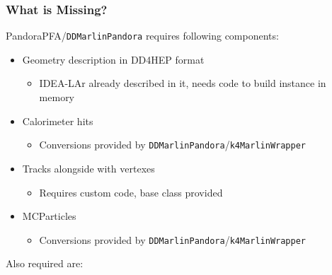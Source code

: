 \documentclass[aspectratio=169]{beamer}
\newcommand{\bluetext}[1]{%
  \textcolor{myBlue}{#1}
}
\newcommand{\redtext}[1]{%
  \textcolor{myRed}{#1}
}
\begin{document}
\begin{frame}
  \frametitle{What is Missing?}

  \scriptsize
  PandoraPFA/\texttt{DDMarlinPandora} requires following components:

  \vspace{-1ex}

  \begin{itemize}\scriptsize
    \item \bluetext{Geometry description in DD4HEP format}
          \begin{itemize}\scriptsize
            \item IDEA-LAr already described in it, needs code to build
                  instance in memory
          \end{itemize}
   \item \bluetext{Calorimeter hits}
          \begin{itemize}\scriptsize
            \item Conversions provided by
                  \texttt{DDMarlinPandora}/\texttt{k4MarlinWrapper}
          \end{itemize}
    \item \redtext{Tracks alongside with vertexes}
          \begin{itemize}\scriptsize
            \item Requires custom code, base class provided
          \end{itemize}
    \item \bluetext{MCParticles}
          \begin{itemize}\scriptsize
            \item Conversions provided by
                  \texttt{DDMarlinPandora}/\texttt{k4MarlinWrapper}
          \end{itemize}
  \end{itemize}

  Also required are:

  \vspace{-1ex}


\end{frame}
\end{document}

